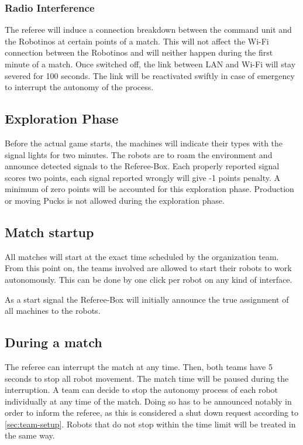 \documentclass[12pt,twoside]{article}
\newenvironment{rulechange}{}{}
\begin{document}
\subsubsection{Radio Interference}
\label{sec:radio-interference}
The referee will induce a connection breakdown between the command
unit and the Robotinos at certain points of a match. This will not
affect the Wi-Fi connection between the Robotinos and will neither
happen during the first minute of a match. Once switched off, the link
between LAN and Wi-Fi will stay severed for 100 seconds. The link will
be reactivated swiftly in case of emergency to interrupt the autonomy
of the process.


\subsection{Exploration Phase}
\begin{rulechange}
Before the actual game starts, the machines will indicate their types with the
signal lights for two minutes. The robots are to roam the environment and
announce detected signals to the Referee-Box. Each properly reported signal
scores two points, each signal reported wrongly will give -1 points penalty.
A minimum of zero points will be accounted for this exploration phase.
Production or moving Pucks is not allowed during the exploration phase.
\end{rulechange}

\subsection{Match startup}
\label{sec:match-startup}
All matches will start at the exact time scheduled by the organization
team. From this point on, the teams involved are allowed to start
their robots to work autonomously. This can be done by one click per
robot on any kind of interface. 

\begin{rulechange}
As a start signal the Referee-Box will initially announce the true assignment of
all machines to the robots.
\end{rulechange}

\subsection{During a match}

The referee can interrupt the match at any time. Then, both teams have
5 seconds to stop all robot movement. The match time will be paused
during the interruption. A team can decide to stop the autonomy
process of each robot individually at any time of the match. Doing so
has to be announced notably in order to inform the referee, as this is
considered a shut down request according to
\ref{sec:team-setup}. Robots that do not stop within the time limit
will be treated in the same way.
\end{document}
